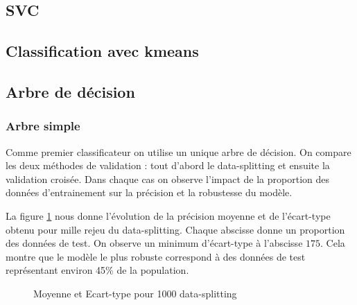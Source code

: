 \documentclass[11pt,a4paper]{article}
\begin{document}
	\subsection{SVC}
	\subsection{Classification avec kmeans}

	\subsection{Arbre de décision}

		\subsubsection{Arbre simple}
			Comme premier classificateur on utilise un unique arbre de décision. On compare les deux méthodes de validation : tout d'abord le data-splitting et ensuite la validation croisée. Dans chaque cas on observe l'impact de la proportion des données d'entrainement sur la précision et la robustesse du modèle.

			La figure \ref{data-splitting-dt} nous donne l'évolution de la précision moyenne et de l'écart-type obtenu pour mille rejeu du data-splitting. Chaque abscisse donne un proportion des données de test. On observe un minimum d'écart-type à l'abscisse $175$. Cela montre que le modèle le plus robuste correspond à des données de test représentant environ 45\% de la population.

			\begin{figure}
				\caption{Moyenne et Ecart-type pour 1000 data-splitting}
				\label{data-splitting-dt}
			\end{figure}
\end{document}

